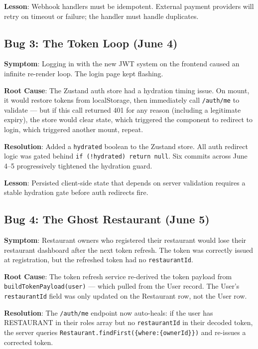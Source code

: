 \documentclass[11pt,a4paper,twoside]{book}
\begin{document}
\textbf{Lesson}: Webhook handlers must be idempotent.  External payment providers
will retry on timeout or failure; the handler must handle duplicates.

\subsection{Bug 3: The Token Loop (June 4)}

\textbf{Symptom}: Logging in with the new JWT system on the frontend caused an
infinite re-render loop.  The login page kept flashing.

\textbf{Root Cause}: The Zustand auth store had a hydration timing issue.  On
mount, it would restore tokens from localStorage, then immediately call
\texttt{/auth/me} to validate — but if this call returned 401 for any reason
(including a legitimate expiry), the store would clear state, which triggered
the component to redirect to login, which triggered another mount, repeat.

\textbf{Resolution}: Added a \texttt{hydrated} boolean to the Zustand store.
All auth redirect logic was gated behind \texttt{if (!hydrated) return null}.
Six commits across June 4–5 progressively tightened the hydration guard.

\textbf{Lesson}: Persisted client-side state that depends on server validation
requires a stable hydration gate before auth redirects fire.

\subsection{Bug 4: The Ghost Restaurant (June 5)}

\textbf{Symptom}: Restaurant owners who registered their restaurant would lose
their restaurant dashboard after the next token refresh.  The token was correctly
issued at registration, but the refreshed token had no \texttt{restaurantId}.

\textbf{Root Cause}: The token refresh service re-derived the token payload from
\texttt{buildTokenPayload(user)} — which pulled from the User record.  The
User's \texttt{restaurantId} field was only updated on the Restaurant row, not
the User row.

\textbf{Resolution}: The \texttt{/auth/me} endpoint now auto-heals: if the user
has RESTAURANT in their roles array but no \texttt{restaurantId} in their
decoded token, the server queries \texttt{Restaurant.findFirst(\{where:\{ownerId\}\})}
and re-issues a corrected token.
\end{document}
